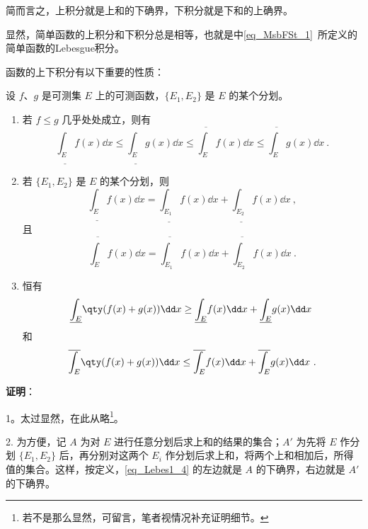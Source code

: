 简而言之，上积分就是上和的下确界，下积分就是下和的上确界。

显然，简单函数的上积分和下积分总是相等，也就是中\autoref{eq_MsbFSt_1}~所定义的简单函数的Lebesgue积分。

函数的上下积分有以下重要的性质：

\begin{theorem}{}\label{the_Lebes1_1}

设 $f$、$g$ 是可测集 $E$ 上的可测函数，$\{E_1, E_2\}$ 是 $E$ 的某个分划。

\begin{enumerate}
  \item 若 $f\leq g$ 几乎处处成立，则有
  \begin{equation}
  \underline{\int_E} f(x) \dd x \leq \underline{\int_E} g(x) \dd x \leq \overline{\int_E} f(x) \dd x \leq \overline{\int_E} g(x) \dd x~.
  \end{equation}
  \item 若 $\{E_1, E_2\}$ 是 $E$ 的某个分划，则
  \begin{equation}\label{eq_Lebes1_1}
  \underline{\int_E} f(x) \dd x=\underline{\int_{E_1}} f(x) \dd x+\underline{\int_{E_2}} f(x) \dd x~,
  \end{equation}
  且
  \begin{equation}\label{eq_Lebes1_4}
  \overline{\int_E} f(x) \dd x=\overline{\int_{E_1}} f(x) \dd x+\overline{\int_{E_2}} f(x) \dd x~.
  \end{equation}
  \item 恒有
  \begin{equation}\label{eq_Lebes1_5}
  \underline{\int_E} \qty(f(x)+g(x)) \dd x \geq \underline{\int_E} f(x) \dd x+\underline{\int_E} g(x) \dd x~
  \end{equation}
  和
  \begin{equation}\label{eq_Lebes1_6}
  \overline{\int_E} \qty(f(x)+g(x)) \dd x \leq \overline{\int_E} f(x) \dd x+\overline{\int_E} g(x) \dd x~.
  \end{equation}
\end{enumerate}



\end{theorem}

\textbf{证明}：

1。太过显然，在此从略\footnote{若不是那么显然，可留言，笔者视情况补充证明细节。}。

2. 为方便，记 $A$ 为对 $E$ 进行任意分划后求上和的结果的集合；$A'$ 为先将 $E$ 作分划 $\{E_1, E_2\}$ 后，再分别对这两个 $E_i$ 作分划后求上和，将两个上和相加后，所得值的集合。这样，按定义，\autoref{eq_Lebes1_4} 的左边就是 $A$ 的下确界，右边就是 $A'$ 的下确界。

